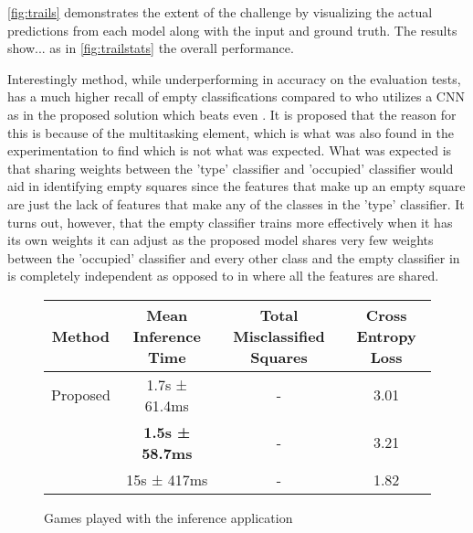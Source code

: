 \autoref{fig:trails} demonstrates the extent of the challenge by visualizing the actual predictions from each model along with the input and ground truth. 
The results show...  as in \autoref{fig:trailstats} the overall performance.

Interestingly \cite{} method, while underperforming in accuracy on the evaluation tests, has a much higher recall of empty classifications compared to \cite{} 
who utilizes a CNN as in the proposed solution which beats even \cite{}.  It is proposed that the reason for this is because of the multitasking element, which 
is what was also found in the experimentation to find  which is not what was expected.  What was expected is that sharing weights between 
the 'type' classifier and 'occupied' classifier would aid in identifying empty squares since the features that make up an empty square are just the lack of 
features that make any of the classes in the 'type' classifier.  It turns out, however, that the empty classifier trains more effectively when it has its own 
weights it can adjust as the proposed model shares very few weights between the 'occupied' classifier and every other class and the empty classifier in \cite{} 
is completely independent as opposed to in \cite{} where all the features are shared.

\begin{figure}[h]
    \centering
    \begin{tabular}{|c|c|c|c|}
        \hline
        Method & Mean Inference Time & Total Misclassified Squares & Cross Entropy Loss \\
        \hline
        Proposed & 1.7s ± 61.4ms  & - & 3.01 \\
        \cite{} & \textbf{1.5s ± 58.7ms} & - & 3.21 \\
        \cite{} & 15s ± 417ms & - & 1.82 \\
        \hline
    \end{tabular}
\caption{Games played with the inference application}
\label{fig:trailstats}
\end{figure}


